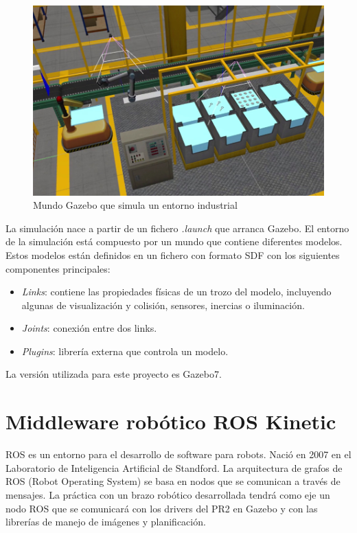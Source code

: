 \documentclass[12pt,spanish,chapterprefix, numbers=noenddot]{book}
\numberwithin{equation}{section}
\numberwithin{figure}{section}
\begin{document}
\begin{figure}[hbt!]
\centering
\includegraphics[width=12cm]{Figs/gazebo_example.jpg}
\par
\caption{\label{fig:gazeboExample}Mundo Gazebo que simula un entorno industrial}
\end{figure}

La simulación nace a partir de un fichero \textit{.launch} que arranca Gazebo. El entorno de la simulación está compuesto por un mundo que contiene diferentes modelos. Estos modelos están definidos en un fichero con formato SDF con los siguientes componentes principales:

\begin{itemize}
\item \textit{Links}: contiene las propiedades físicas de un trozo del modelo, incluyendo algunas de visualización y colisión, sensores, inercias o iluminación.
\item \textit{Joints}: conexión entre dos links.
\item \textit{Plugins}: librería externa que controla un modelo. 
\end{itemize}

La versión utilizada para este proyecto es Gazebo7.

\section{Middleware robótico ROS Kinetic}
ROS es un entorno para el desarrollo de software para robots. Nació en 2007 en el Laboratorio de Inteligencia Artificial de Standford. La arquitectura de grafos de ROS (Robot Operating System) se basa en nodos que se comunican a través de mensajes. La práctica con un brazo robótico desarrollada tendrá como eje un nodo ROS que se comunicará con los drivers del PR2 en Gazebo y con las librerías de manejo de imágenes y planificación. 
\end{document}
